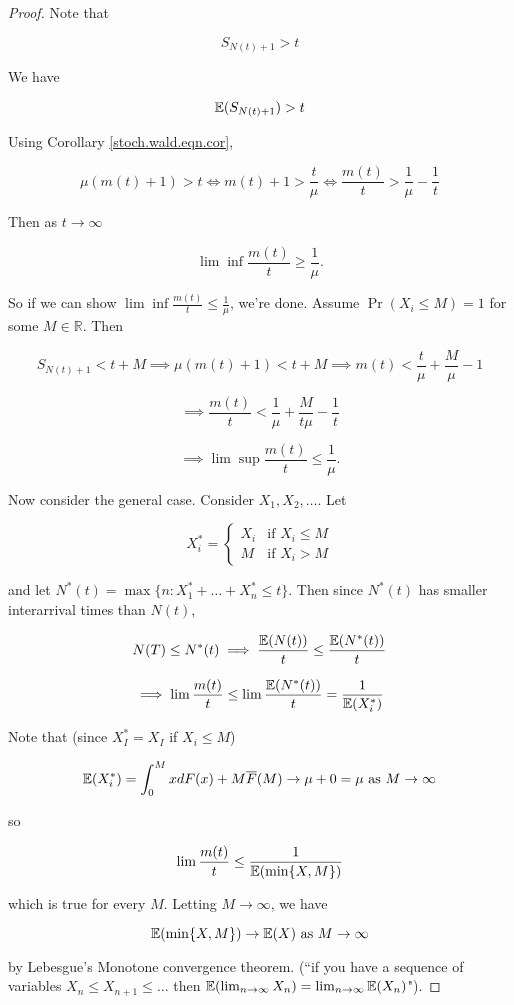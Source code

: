 \begin{proof}

Note that

\[
S_{N(t) + 1} > t
\]

We have

\[
\E(S_{N(t) + 1}) > t
\]

Using Corollary \ref{stoch.wald.eqn.cor},

\[
\mu(m(t) + 1) > t \iff m(t) + 1 > \frac{t}{\mu} \iff \frac{m(t)}{t} > \frac{1}{\mu} - \frac{1}{t} 
\]

Then as \(t \to \infty\)

\[
\lim \inf \frac{m(t)}{t} \geq \frac{1}{\mu}.
\]

So if we can show \(\lim \inf \frac{m(t)}{t} \leq \frac{1}{\mu}\), we're done. Assume \(\Pr(X_i \leq M) = 1\) for some \(M \in \mathbb{R}\). Then

\[
S_{N(t) + 1} < t + M \implies \mu(m(t)+ 1) < t + M \implies m(t) < \frac{t}{\mu} + \frac{M}{\mu} - 1
\]

\[
\implies \frac{m(t)}{t} < \frac{1}{\mu} + \frac{M}{t\mu} - \frac{1}{t} 
\]

\[
\implies \lim \sup \frac{m(t)}{t} \leq \frac{1}{\mu}.
\]

Now consider the general case. Consider \(X_1, X_2, \ldots\). Let

\[
X_i^* = \begin{cases}
X_i & \text{if } X_i \leq M \\
M & \text{if } X_i > M
\end{cases}
\]


and let \(N^*(t) = \max \{n: X_1^* + \ldots + X_n^* \leq t\}\). Then since \(N^*(t)\) has smaller interarrival times than \(N(t)\),

\[
N(T) \leq N^*(t) \implies \frac{\E(N(t))}{t} \leq \frac{\E(N^*(t)) }{t}
\]

\[
\implies \lim \frac{m(t)}{t} \leq \lim \frac{\E(N^*(t))}{t} = \frac{1}{\E(X_i^*)}
\]

Note that (since \(X_I^* = X_I\) if \(X_i \leq M\))

\[
\E(X_i^*) = \int_0^M x dF(x) + M \overline{F}(M) \to \mu + 0 = \mu \text{ as } M \to \infty
\]

so

\[
 \lim \frac{m(t)}{t} \leq \frac{1}{\E(\min\{X, M \})}
\]

which is true for every \(M\). Letting \(M \to \infty\), we have

\[
\E(\min\{X, M \}) \to \E(X) \text{ as } M \to \infty
\]

by Lebesgue's Monotone convergence theorem. (``if you have a sequence of variables \(X_n \leq X_{n+1} \leq \ldots\) then \(\E(\lim_{n \to \infty} X_n) = \lim_{n \to \infty} \E(X_n)\)"). 


\end{proof}

